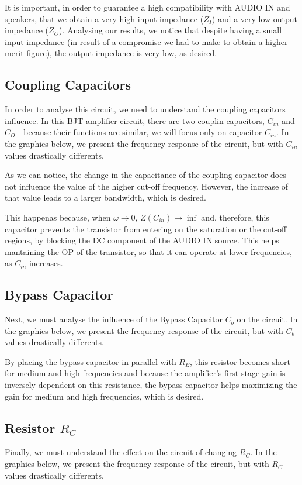 It is important, in order to guarantee a high compatibility with AUDIO IN and speakers, that we obtain a very high input impedance ($Z_I$) and a very low output impedance ($Z_O$). Analysing our results, we notice that despite having a small input impedance (in result of a compromise we had to make to obtain a higher merit figure), the output impedance is very low, as desired.


\subsection{Coupling Capacitors}
In order to analyse this circuit, we need to understand the coupling capacitors influence. In this BJT amplifier circuit, there are two couplin capacitors, $C_{in}$ and $C_O$ - because their functions are similar, we will focus only on capacitor $C_{in}$. In the graphics below, we present the frequency response of the circuit, but with $C_{in}$ values drastically differents.

As we can notice, the change in the capacitance of the coupling capacitor does not influence the value of the higher cut-off frequency. However, the increase of that value leads to a larger bandwidth, which is desired.

This happenas because, when $\omega \to 0$, $Z(C_{in}) \to \inf$ and, therefore, this capacitor prevents the transistor from entering on the saturation or the cut-off regions, by blocking the DC component of the AUDIO IN source. This helps mantaining the OP of the transistor, so that it can operate at lower frequencies, as $C_{in}$ increases.


\subsection{Bypass Capacitor}
Next, we must analyse the influence of the Bypass Capacitor $C_b$ on the circuit. In the graphics below, we present the frequency response of the circuit, but with $C_b$ values drastically differents.

By placing the bypass capacitor in parallel with $R_E$, this resistor becomes short for medium and high frequencies and because the amplifier's first stage gain is inversely dependent on this resistance, the bypass capacitor helps maximizing the gain for medium and high frequencies, which is desired.


\subsection{Resistor $R_C$}
Finally, we must understand the effect on the circuit of changing $R_C$. In the graphics below, we present the frequency response of the circuit, but with $R_C$ values drastically differents.

